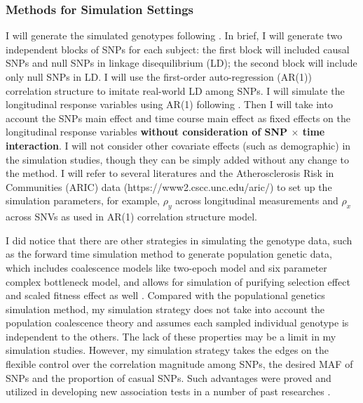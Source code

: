 \documentclass[12pt]{article}
\begin{document}
\subsubsection{Methods for Simulation Settings}\label{sec:subsub1-2}
I will generate the simulated genotypes following \cite{Wang2007,Pan2009,Basu2011}. In brief,
I will generate two independent blocks of SNPs for each subject: the
first block will included causal SNPs and null SNPs in linkage
disequilibrium (LD); the second block will include only null SNPs in LD. I will use the first-order auto-regression (AR(1)) correlation structure to imitate real-world LD among SNPs. I will simulate the longitudinal response variables using AR(1) following \cite{Song2013}. Then I will take into account the SNPs main effect and time course main effect as fixed effects on the longitudinal response variables \textbf{without consideration of SNP $\times$ time interaction}. I will not consider other covariate effects (such as demographic) in the simulation studies, though they can be simply added without any change to the method. I will refer to several literatures \cite{pan2014powerful,Basu2011,Pan2011,Han2010,Pan2009} and the Atherosclerosis Risk in Communities (ARIC) data (https://www2.cscc.unc.edu/aric/) to set up the simulation parameters, for example, $\rho_y$ across longitudinal measurements and $\rho_x$ across SNVs as used in AR(1) correlation structure model.

I did notice that there are other strategies in simulating the genotype data, such as the forward time simulation method to generate population genetic data, which includes coalescence models like two-epoch model and six parameter complex bottleneck model, and allows for simulation of purifying selection effect and scaled fitness effect as well \cite{Boyko2008,Hernandez2008}. Compared with the populational genetics simulation method, my simulation strategy does not take into account the population coalescence theory and assumes each sampled individual genotype is independent to the others. The lack of these properties may be a limit in my simulation studies. However, my simulation strategy takes the edges on the flexible control over the correlation magnitude among SNPs, the desired MAF of SNPs and the proportion of casual SNPs. Such advantages were proved and utilized in developing new association tests in a number of past researches \cite{Wang2007,Pan2009,Han2010,Pan2011,Basu2011,pan2014powerful,zhang2014testing}. 
\end{document}
